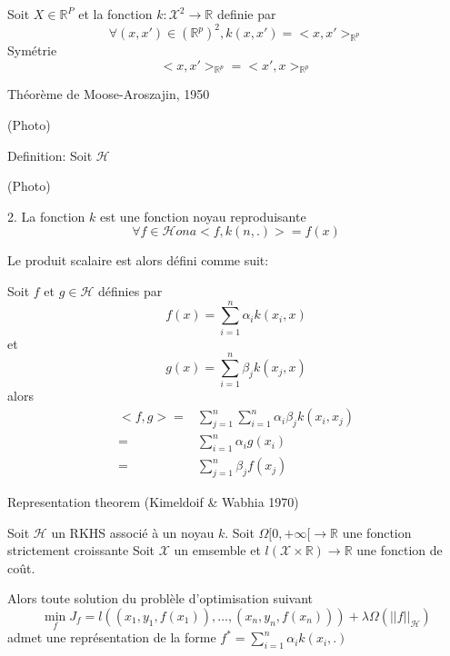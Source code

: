 \documentclass{article}
\begin{document}
Soit $X\in\mathbb{R}^P$ et la fonction $k:\mathcal{X}^2\to\mathbb{R}$ definie par
\begin{equation}
\forall (x,x')\in (\mathbb{R}^p)^2, k(x,x')=<x,x'>_{\mathbb{R}^p}
\end{equation}
Sym\'etrie
\begin{equation}
<x,x'>_{\mathbb{R}^p}=<x',x>_{\mathbb{R}^p}
\end{equation}

Th\'eor\`eme de Moose-Aroszajin, 1950

(Photo)

Definition: Soit $\mathcal{H}$

(Photo)

2. La fonction $k$ est une fonction noyau reproduisante 
\begin{equation}
\forall f\in \mathcal{H} on a <f,k(n,.)>=f(x)
\end{equation}

Le produit scalaire est alors d\'efini comme suit:

Soit $f$ et $g\in\mathcal{H}$ d\'efinies par
\begin{equation}
f(x)=\sum_{i=1}^n\alpha_ik(x_i,x)
\end{equation}
et
\begin{equation}
g(x)=\sum_{i=1}^n\beta_jk(x_j,x)
\end{equation}
alors
\begin{equation}
\begin{split}
<f,g>=&\sum_{j=1}^n\sum_{i=1}^n\alpha_i\beta_jk(x_i,x_j)\\
=&\sum_{i=1}^n\alpha_ig(x_i)\\
=&\sum_{j=1}^n\beta_jf(x_j)
\end{split}
\end{equation}

Representation theorem (Kimeldoif \& Wabhia 1970)

Soit $\mathcal{H}$ un RKHS associ\'e \`a un noyau $k$.
Soit $\Omega [0,+\infty [\to\mathbb{R} $ une fonction strictement croissante
Soit $\mathcal{X}$ un emsemble et $l(\mathcal{X}\times\mathbb{R})\to\mathbb{R}$ une fonction de co\^ut.

Alors toute solution du probl\`ele d'optimisation suivant 
\begin{equation}
\min_fJ_f=l((x_1,y_1,f(x_1)),\ldots,(x_n,y_n,f(x_n)))+\lambda\Omega(||f||_\mathcal{H})
\end{equation}
admet une repr\'esentation de la forme $f^*=\sum_{i=1}^n\alpha_ik(x_i,.)$
\end{document}
